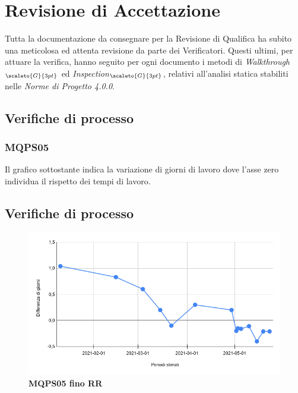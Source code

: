 {{{{{{{{{{{{{\section{Revisione di Accettazione}\label{ResocontoAttivitàDiVerificaRevisioneDiAccettazione}
Tutta la documentazione da consegnare per la Revisione di Qualifica ha subito una meticolosa ed attenta revisione da parte dei Verificatori. Questi ultimi, per attuare la verifica, hanno seguito per ogni documento i metodi di \textit{Walkthrough}$_{\scaleto{G}{3pt}}$ ed \textit{Inspection}$_{\scaleto{G}{3pt}}$, relativi all'analisi statica stabiliti nelle \textit{Norme di Progetto 4.0.0}.

\subsection{Verifiche di processo}\label{ResocontoAttivitàDiVerificaRevisioneDiAccettazioneVerificheDiProcesso}

\subsubsection{MQPS05}\label{ResocontoAttivitàDiVerificaRevisioneDiAccettazioneVerificheDiProcessoMPQS05}

Il grafico sottostante indica la variazione di giorni di lavoro dove l'asse zero individua il rispetto dei tempi di lavoro. \\
\subsection{Verifiche di processo} \label{RevisioneDiAccettazioneVerificheDiProcesso}
\begin{center}
	\begin{figure}[H]
		\includegraphics[width=1\linewidth]{../immagini/Metriche/MQPS05_RA.png}
		\caption{\textbf{MQPS05 fino RR}}
	\end{figure}
\end{center}


}}}}}}}}}}}}}
